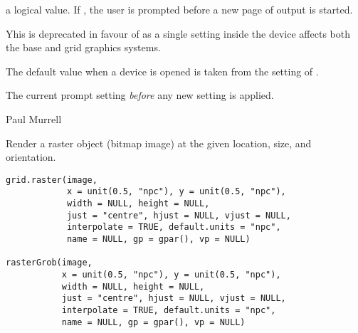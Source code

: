 %
\begin{Arguments}
\begin{ldescription}
\item[\code{ask}]  a logical value.  If , the user
is prompted before a new page of output is started. 
\end{ldescription}
\end{Arguments}
%
\begin{Details}\relax
Yhis is deprecated in favour of  as a
single setting inside the device affects both the base and grid
graphics systems.

The default value when a device is opened is taken from the
setting of .
\end{Details}
%
\begin{Value}
The current prompt setting \emph{before} any new setting is applied.
\end{Value}
%
\begin{Author}\relax
 Paul Murrell 
\end{Author}
%
\begin{SeeAlso}\relax
\end{SeeAlso}
%
\begin{Description}\relax
Render a raster object (bitmap image) at the given location, size,
and orientation.
\end{Description}
%
\begin{Usage}
\begin{verbatim}
grid.raster(image,
            x = unit(0.5, "npc"), y = unit(0.5, "npc"),
            width = NULL, height = NULL,
            just = "centre", hjust = NULL, vjust = NULL,
            interpolate = TRUE, default.units = "npc",
            name = NULL, gp = gpar(), vp = NULL)

rasterGrob(image,
           x = unit(0.5, "npc"), y = unit(0.5, "npc"),
           width = NULL, height = NULL,
           just = "centre", hjust = NULL, vjust = NULL,
           interpolate = TRUE, default.units = "npc",
           name = NULL, gp = gpar(), vp = NULL)
\end{verbatim}
\end{Usage}
%

